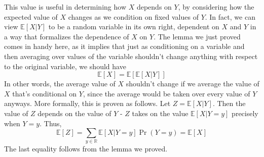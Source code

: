 \documentclass{article}
\newcommand*{\R}{\mathbb{R}}
\newcommand*{\E}{\mathbb{E}}
\begin{document}
This value is useful in determining how $ X $ depends on $ Y $, by considering how the expected value of $ X $ changes as we condition on fixed values of $ Y $. In fact, we can view $ \E[X | Y] $ to be a random variable in its own right, dependent on $ X $ and $ Y $ in a way that formalizes the dependence of $ X $ on $ Y $. The lemma we just proved comes in handy here, as it implies that just as conditioning on a variable and then averaging over values of the variable shouldn't change anything with respect to the original variable, we should have
$$ \E[X] = \E[\E[X | Y]] $$
In other words, the average value of $ X $ shouldn't change if we average the value of $ X $ that's conditional on $ Y $, since the average would be taken over every value of $ Y $ anyways. More formally, this is proven as follows. Let $ Z = \E[X | Y] $. Then the value of $ Z $ depends on the value of $ Y $ - $ Z $ takes on the value $ \E[X | Y = y] $ precisely when $ Y = y $. Thus,
$$ \E[Z] = \sum_{y \in \R} \E[X | Y = y] \Pr(Y = y) = \E[X] $$
The last equality follows from the lemma we proved.
\end{document}
